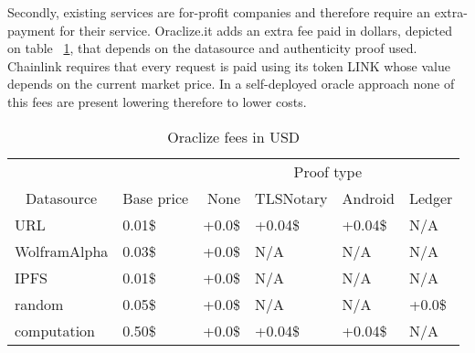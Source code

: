 Secondly, existing services are for-profit companies and therefore require an extra-payment for their service. Oraclize.it adds an extra fee paid in dollars, depicted on table ~\ref{tab:oraclize-fees}, that depends on the datasource and authenticity proof used. Chainlink requires that every request is paid using its token LINK whose value depends on the current market price. In a self-deployed oracle approach none of this fees are present lowering therefore to lower costs.

\begin{table}
    \centering
    \begin{tabular}{@{}llllll@{}}
        \cmidrule(l){3-6}
                                       & \multicolumn{1}{l|}{}          & \multicolumn{4}{c|}{Proof type}                                                                                            \\ \cmidrule(r){1-2}
        \multicolumn{1}{c}{Datasource} & \multicolumn{1}{c}{Base price} & \multicolumn{1}{r}{None}        & \multicolumn{1}{r}{TLSNotary} & \multicolumn{1}{r}{Android} & \multicolumn{1}{r}{Ledger} \\ \midrule
        URL                            & 0.01\$                         & +0.0\$                          & +0.04\$                       & +0.04\$                     & N/A                        \\
        WolframAlpha                   & 0.03\$                         & +0.0\$                          & N/A                           & N/A                         & N/A                        \\
        IPFS                           & 0.01\$                         & +0.0\$                          & N/A                           & N/A                         & N/A                        \\
        random                         & 0.05\$                         & +0.0\$                          & N/A                           & N/A                         & +0.0\$                     \\
        computation                    & 0.50\$                         & +0.0\$                          & +0.04\$                       & +0.04\$                     & N/A                        \\ \bottomrule
    \end{tabular}
    \caption{Oraclize fees in USD}
    \label{tab:oraclize-fees}
\end{table}

